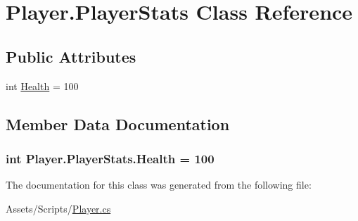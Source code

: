 \hypertarget{class_player_1_1_player_stats}{}\section{Player.\+Player\+Stats Class Reference}
\label{class_player_1_1_player_stats}
\subsection*{Public Attributes}
\begin{DoxyCompactItemize}
\item 
int \hyperlink{class_player_1_1_player_stats_a2a4c4173f0adbea783f9bdb1c5084ea2}{Health} = 100
\end{DoxyCompactItemize}


\subsection{Member Data Documentation}
\hypertarget{class_player_1_1_player_stats_a2a4c4173f0adbea783f9bdb1c5084ea2}{}
\subsubsection[{Health}]{\setlength{\rightskip}{0pt plus 5cm}int Player.\+Player\+Stats.\+Health = 100}\label{class_player_1_1_player_stats_a2a4c4173f0adbea783f9bdb1c5084ea2}


The documentation for this class was generated from the following file\+:\begin{DoxyCompactItemize}
\item 
Assets/\+Scripts/\hyperlink{_player_8cs}{Player.\+cs}\end{DoxyCompactItemize}
